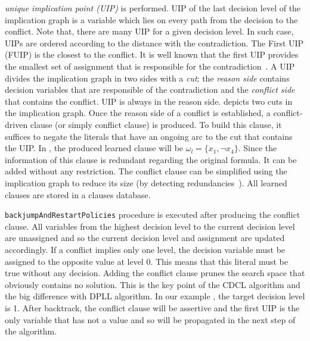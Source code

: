 \emph{unique implication point (UIP)} is performed. UIP of the last decision level of the implication graph is a variable
which lies on every path from the decision to the conflict. Note that, there are many UIP for a given decision level.
In such case, UIPs are ordered according to the distance with the contradiction. The First UIP (FUIP) is the closest to
the conflict. It is well known that the first UIP provides the smallest set of assignment that is responsible for the
contradiction~\cite{zhang2001efficient}.
A UIP divides the implication graph in two sides with a \emph{cut}; the \emph{reason side} contains decision variables 
that are responsible of the contradiction and the \emph{conflict side} that contains the conflict. 
 UIP is always in the reason side.  depicts two cuts in the implication graph.
Once the reason side of a conflict is established, a conflict-driven clause (or simply conflict clause) is produced.
To build this clause, it suffices to negate the
literals that have an ongoing arc to the  cut that contains the UIP. In , the produced
learned clause will be $\omega_l = \{x_1, \neg x_4 \}$. Since the information of this clause is redundant regarding 
the original formula. It can be added without any  restriction. The conflict clause can be simplified
using the implication graph to reduce its size (by detecting redundancies~\cite{sorensson2009minimizing}).
 All learned clauses are stored in a clauses database.
 
  \texttt{backjumpAndRestartPolicies} procedure is executed after producing the conflict clause.
All variables from the highest decision level to the current decision level are unassigned and so 
the current decision level and assignment are updated accordingly.
If a conflict implies only one level, the decision variable must be assigned 
to the opposite value at level 0. This means that this literal must be true without any decision.
Adding the conflict clause prunes the search space that obviously contains no solution.
This is the key point of the CDCL algorithm and the big difference with DPLL algorithm.
 In our example , the target decision level is 1.
After backtrack, the conflict clause will be assertive and the first UIP is the only variable that has
not a value and so will be propagated in the next step of the algorithm.
 
